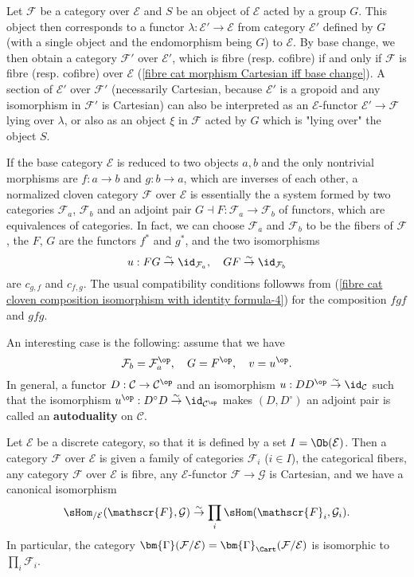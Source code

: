 \begin{example}
Let $\mathcal{F}$ be a category over $\mathcal{E}$ and $S$ be an object of $\mathcal{E}$ acted by a group $G$. This object then corresponds to a functor $\lambda:\mathcal{E}'\to \mathcal{E}$ from category $\mathcal{E}'$ defined by $G$ (with a single object and the endomorphism being $G$) to $\mathcal{E}$. By base change, we then obtain a category $\mathscr{F}'$ over $\mathcal{E}'$, which is fibre (resp. cofibre) if and only if $\mathcal{F}$ is fibre (resp. cofibre) over $\mathcal{E}$ (\cref{fibre cat morphism Cartesian iff base change}). A section of $\mathcal{E}'$ over $\mathcal{F}'$ (necessarily Cartesian, because $\mathcal{E}'$ is a gropoid and any isomorphism in $\mathcal{F}'$ is Cartesian) can also be interpreted as an $\mathcal{E}$-functor $\mathcal{E}'\to \mathcal{F}$ lying over $\lambda$, or also as an object $\xi$ in $\mathcal{F}$ acted by $G$ which is "lying over" the object $S$.
\end{example}
\begin{example}\label{fibre cat given by quasi-inverse of cat}
If the base category $\mathcal{E}$ is reduced to two objects $a,b$ and the only nontrivial morphisms are $f:a\to b$ and $g:b\to a$, which are inverses of each other, a normalized cloven category $\mathcal{F}$ over $\mathcal{E}$ is essentially the a system formed by two categories $\mathcal{F}_a$, $\mathcal{F}_b$ and an adjoint pair $G\dashv F:\mathcal{F}_a\to \mathcal{F}_b$ of functors, which are equivalences of categories. In fact, we can choose $\mathcal{F}_a$ and $\mathcal{F}_b$ to be the fibers of $\mathcal{F}$, the $F$, $G$ are the functors $f^*$ and $g^*$, and the two isomorphisms
\[u:FG\stackrel{\sim}{\to }\id_{\mathcal{F}_a},\quad GF\stackrel{\sim}{\to }\id_{\mathcal{F}_b}\]
are $c_{g,f}$ and $c_{f,g}$. The usual compatibility conditions followws from (\ref{fibre cat cloven composition isomorphism with identity formula-4}) for the composition $fgf$ and $gfg$.\par
An interesting case is the following: assume that we have
\[\mathcal{F}_b=\mathcal{F}_a^{\op},\quad G=F^{\op},\quad v=u^{\op}.\]
In general, a functor $D:\mathcal{C}\to \mathcal{C}^{\op}$ and an isomorphism $u:DD^\op\stackrel{\sim}{\to }\id_\mathcal{C}$ such that the isomorphism $u^{\op}:D^\circ D\stackrel{\sim}{\to }\id_{\mathcal{C}^{\op}}$ makes $(D,D^\circ)$ an adjoint pair is called an \textbf{autoduality} on $\mathcal{C}$.
\end{example}
\begin{example}\label{fibre cat over set}
Let $\mathcal{E}$ be a discrete category, so that it is defined by a set $I=\Ob(\mathcal{E})$. Then a category $\mathcal{F}$ over $\mathcal{E}$ is given a family of categories $\mathcal{F}_i$ ($i\in I$), the categorical fibers, any category $\mathcal{F}$ over $\mathcal{E}$ is fibre, any $\mathcal{E}$-functor $\mathcal{F}\to \mathcal{G}$ is Cartesian, and we have a canonical isomorphism
\[\sHom_{/\mathcal{E}}(\mathscr{F},\mathcal{G})\stackrel{\sim}{\to }\prod_i\sHom(\mathscr{F}_i,\mathcal{G}_i).\]
In particular, the category $\bm{\Gamma}(\mathcal{F}/\mathcal{E})=\bm{\Gamma}_{\Cart}(\mathcal{F}/\mathcal{E})$ is isomorphic to $\prod_i\mathcal{F}_i$.
\end{example}

